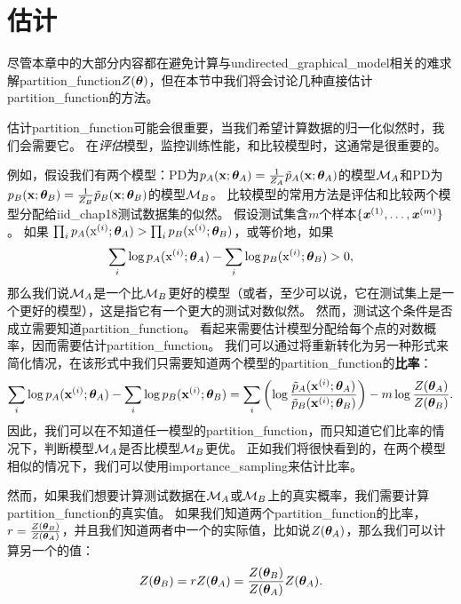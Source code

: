 \section{估计}
\label{sec:estimating_the_partition_function}
尽管本章中的大部分内容都在避免计算与\gls{undirected_graphical_model}相关的难求解\gls{partition_function}$Z(\boldsymbol{\theta})$，但在本节中我们将会讨论几种直接估计\gls{partition_function}的方法。


估计\gls{partition_function}可能会很重要，当我们希望计算数据的归一化似然时，我们会需要它。
在\emph{评估}模型，监控训练性能，和比较模型时，这通常是很重要的。


例如，假设我们有两个模型：\gls{PD}为$p_A(\mathbf{x}; \boldsymbol{\theta}_A)= \frac{1}{Z_A} \tilde{p}_A(\mathbf{x}; \boldsymbol{\theta}_A)$的模型$\mathcal{M}_A$和\gls{PD}为$p_B(\mathbf{x}; \boldsymbol{\theta}_B)= \frac{1}{Z_B} \tilde{p}_B(\mathbf{x}; \boldsymbol{\theta}_B)$的模型$\mathcal{M}_B$。
比较模型的常用方法是评估和比较两个模型分配给\gls{iid_chap18}测试数据集的似然。
假设测试集含$m$个样本$\{ \boldsymbol{\mathit{x}}^{(1)}, \dots, \boldsymbol{\mathit{x}}^{(m)} \}$。
如果 $\prod_i p_A ( \mathrm{x}^{(i)}; \boldsymbol{\theta}_A) > \prod_i p_B( \mathrm{x}^{(i)}; \boldsymbol{\theta}_B)$，或等价地，如果
\begin{equation}
\label{eq:18.38}
	\sum_i \log p_A (\mathrm{x}^{(i)}; \boldsymbol{\theta}_A) - \sum_i \log p_B(\mathrm{x}^{(i)}; \boldsymbol{\theta}_B) > 0,
\end{equation}
那么我们说$\mathcal{M}_A$是一个比$\mathcal{M}_B$更好的模型（或者，至少可以说，它在测试集上是一个更好的模型），这是指它有一个更大的测试对数似然。
然而，测试这个条件是否成立需要知道\gls{partition_function}。
看起来需要估计模型分配给每个点的对数概率，因而需要估计\gls{partition_function}。
我们可以通过将重新转化为另一种形式来简化情况，在该形式中我们只需要知道两个模型的\gls{partition_function}的\textbf{比率}：
\begin{equation}
\label{eq:18.39}
	\sum_i \log p_A(\mathbf{x}^{(i)}; \boldsymbol{\theta}_A) - \sum_i \log p_B(\mathbf{x}^{(i)}; \boldsymbol{\theta}_B) =
	\sum_i \left(  \log \frac{ \tilde{p}_A(\mathbf{x}^{(i)}; \boldsymbol{\theta}_A) }{ \tilde{p}_B(\mathbf{x}^{(i)}; \boldsymbol{\theta}_B) } \right)  - m\log \frac{Z(\boldsymbol{\theta}_A)}{ Z(\boldsymbol{\theta}_B) }.
\end{equation}
因此，我们可以在不知道任一模型的\gls{partition_function}，而只知道它们比率的情况下，判断模型$\mathcal{M}_A$是否比模型$\mathcal{M}_B$更优。
正如我们将很快看到的，在两个模型相似的情况下，我们可以使用\gls{importance_sampling}来估计比率。


然而，如果我们想要计算测试数据在$\mathcal{M}_A$或$\mathcal{M}_B$上的真实概率，我们需要计算\gls{partition_function}的真实值。
如果我们知道两个\gls{partition_function}的比率，$r = \frac{Z(\boldsymbol{\theta}_B)}{ Z(\boldsymbol{\theta}_A) }$，并且我们知道两者中一个的实际值，比如说$Z(\boldsymbol{\theta}_A)$，那么我们可以计算另一个的值：
\begin{equation}
	Z(\boldsymbol{\theta}_B) = r Z(\boldsymbol{\theta}_A) = \frac{ Z(\boldsymbol{\theta}_B) }{ Z(\boldsymbol{\theta}_A) } Z(\boldsymbol{\theta}_A).
\end{equation}


